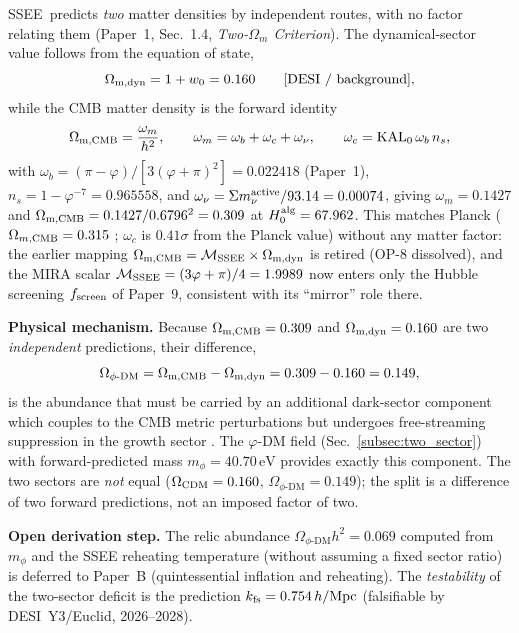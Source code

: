 \documentclass[12pt,a4paper]{article}
\newcommand{\SSEE}{\textsc{SSEE}}
\newcommand{\phiDM}{\phi\text{-DM}}
\newcommand{\MIRA}{\mathcal{M}_{\rm SSEE}}
\newcommand{\kfs}{k_{\rm fs}}
\newcommand{\mphi}{m_\phi}
\newcommand{\mnu}{\Sigma m_\nu}
\newcommand{\Halg}{H_0^{\rm alg}}
\begin{document}
\SSEE\ predicts \emph{two} matter densities by independent routes, with no factor
relating them (Paper~1, Sec.~1.4, \textit{Two-$\Omega_m$ Criterion}). The
dynamical-sector value follows from the equation of state,
\begin{equation}
  \Omega_{\rm m,dyn} = 1 + w_0 = 0.160 \qquad [\text{DESI / background}],
\end{equation}
while the CMB matter density is the forward identity
\begin{equation}
  \Omega_{\rm m,CMB} = \frac{\omega_m}{h^2}, \qquad
  \omega_m = \omega_b + \omega_c + \omega_\nu, \qquad
  \omega_c = \mathrm{KAL}_0\,\omega_b\,n_s,
  \label{eq:omega_m_cmb}
\end{equation}
with $\omega_b = (\pi-\varphi)/[3(\varphi+\pi)^2] = 0.022418$ (Paper~1),
$n_s = 1-\varphi^{-7} = 0.965558$, and $\omega_\nu = \mnu^{\rm active}/93.14 = 0.00074$,
giving $\omega_m = 0.1427$ and $\Omega_{\rm m,CMB} = 0.1427/0.6796^2 = 0.309$ at
$\Halg = 67.962$. This matches Planck ($\Omega_{m,\rm CMB} = 0.315$
\citep{Planck2018}; $\omega_c$ is $0.41\sigma$ from the Planck value) without any
matter factor: the earlier mapping $\Omega_{\rm m,CMB} = \MIRA\times\Omega_{\rm m,dyn}$
is retired (OP-8 dissolved), and the MIRA scalar
$\MIRA = (3\varphi+\pi)/4 = 1.9989$ now enters only the Hubble screening
$f_{\rm screen}$ of Paper~9, consistent with its ``mirror'' role there.

\textbf{Physical mechanism.}
Because $\Omega_{\rm m,CMB} = 0.309$ and $\Omega_{\rm m,dyn} = 0.160$ are two
\emph{independent} predictions, their difference,
\begin{equation}
  \Omega_{\phiDM} = \Omega_{\rm m,CMB} - \Omega_{\rm m,dyn}
    = 0.309 - 0.160 = 0.149,
  \label{eq:two_sector}
\end{equation}
is the abundance that must be carried by an additional dark-sector component which
couples to the CMB metric perturbations but undergoes free-streaming suppression in
the growth sector \citep{Hu1998}. The $\varphi$-DM field
(Sec.~\ref{subsec:two_sector}) with forward-predicted mass
$\mphi = 40.70\,\mathrm{eV}$ provides exactly this component. The two sectors are
\emph{not} equal ($\Omega_{\rm CDM} = 0.160$, $\Omega_{\phiDM} = 0.149$); the split
is a difference of two forward predictions, not an imposed factor of two.

\textbf{Open derivation step.}
The relic abundance $\Omega_{\phiDM}h^2 = 0.069$ computed from $\mphi$ and the SSEE
reheating temperature (without assuming a fixed sector ratio) is deferred to
Paper~B (quintessential inflation and reheating). The \emph{testability} of the
two-sector deficit is the prediction $\kfs = 0.754\,h/\mathrm{Mpc}$
(falsifiable by DESI~Y3/Euclid, 2026--2028).
\end{document}
